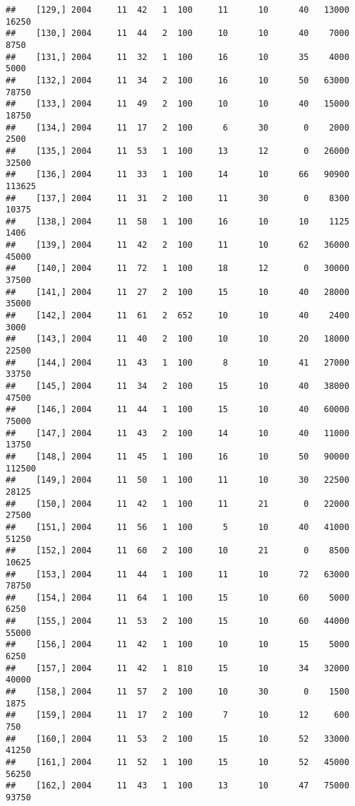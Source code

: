 \documentclass{article}\usepackage[]{graphicx}\usepackage[]{color}
\makeatletter
\newenvironment{kframe}{%
 \def\at@end@of@kframe{}%
 \ifinner\ifhmode%
  \def\at@end@of@kframe{\end{minipage}}%
  \begin{minipage}{\columnwidth}%
 \fi\fi%
 \def\FrameCommand##1{\hskip\@totalleftmargin \hskip-\fboxsep
 \colorbox{shadecolor}{##1}\hskip-\fboxsep
     \hskip-\linewidth \hskip-\@totalleftmargin \hskip\columnwidth}%
 \MakeFramed {\advance\hsize-\width
   \@totalleftmargin\z@ \linewidth\hsize
   \@setminipage}}%
 {\par\unskip\endMakeFramed%
 \at@end@of@kframe}
\newenvironment{knitrout}{}{} %
\makeatother
\begin{document}
\begin{knitrout}
\begin{kframe}
\begin{verbatim}
##    [129,] 2004     11  42   1  100     11      10      40   13000   16250
##    [130,] 2004     11  44   2  100     10      10      40    7000    8750
##    [131,] 2004     11  32   1  100     16      10      35    4000    5000
##    [132,] 2004     11  34   2  100     16      10      50   63000   78750
##    [133,] 2004     11  49   2  100     10      10      40   15000   18750
##    [134,] 2004     11  17   2  100      6      30       0    2000    2500
##    [135,] 2004     11  53   1  100     13      12       0   26000   32500
##    [136,] 2004     11  33   1  100     14      10      66   90900  113625
##    [137,] 2004     11  31   2  100     11      30       0    8300   10375
##    [138,] 2004     11  58   1  100     16      10      10    1125    1406
##    [139,] 2004     11  42   2  100     11      10      62   36000   45000
##    [140,] 2004     11  72   1  100     18      12       0   30000   37500
##    [141,] 2004     11  27   2  100     15      10      40   28000   35000
##    [142,] 2004     11  61   2  652     10      10      40    2400    3000
##    [143,] 2004     11  40   2  100     10      10      20   18000   22500
##    [144,] 2004     11  43   1  100      8      10      41   27000   33750
##    [145,] 2004     11  34   2  100     15      10      40   38000   47500
##    [146,] 2004     11  44   1  100     15      10      40   60000   75000
##    [147,] 2004     11  43   2  100     14      10      40   11000   13750
##    [148,] 2004     11  45   1  100     16      10      50   90000  112500
##    [149,] 2004     11  50   1  100     11      10      30   22500   28125
##    [150,] 2004     11  42   1  100     11      21       0   22000   27500
##    [151,] 2004     11  56   1  100      5      10      40   41000   51250
##    [152,] 2004     11  60   2  100     10      21       0    8500   10625
##    [153,] 2004     11  44   1  100     11      10      72   63000   78750
##    [154,] 2004     11  64   1  100     15      10      60    5000    6250
##    [155,] 2004     11  53   2  100     15      10      60   44000   55000
##    [156,] 2004     11  42   1  100     10      10      15    5000    6250
##    [157,] 2004     11  42   1  810     15      10      34   32000   40000
##    [158,] 2004     11  57   2  100     10      30       0    1500    1875
##    [159,] 2004     11  17   2  100      7      10      12     600     750
##    [160,] 2004     11  53   2  100     15      10      52   33000   41250
##    [161,] 2004     11  52   1  100     15      10      52   45000   56250
##    [162,] 2004     11  43   1  100     13      10      47   75000   93750

\end{verbatim}
\end{kframe}
\end{knitrout}
\end{document}
